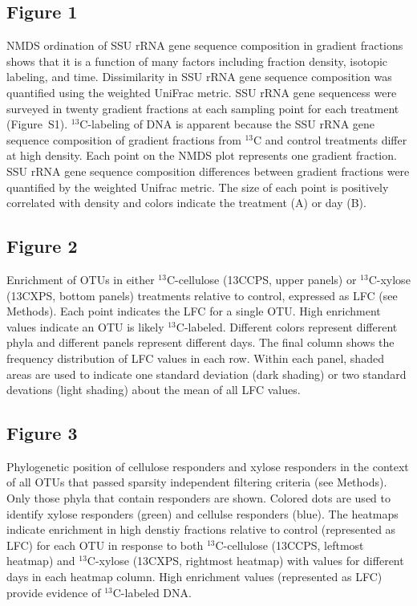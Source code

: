 \subsection{Figure 1}
NMDS ordination of SSU rRNA gene sequence composition in
gradient fractions shows that it is
a function of many factors including fraction density, isotopic labeling, and
time. Dissimilarity in SSU rRNA gene sequence composition was quantified using the 
weighted UniFrac metric. SSU rRNA gene sequencess were surveyed in twenty
gradient fractions at each sampling point for each treatment (Figure~S1).
$^{13}$C-labeling of DNA is apparent because the SSU rRNA gene sequence composition of
gradient fractions from $^{13}$C and control treatments differ at high density.
Each point on the NMDS plot represents one gradient fraction.  SSU rRNA gene sequence
composition differences between gradient fractions were quantified by the
weighted Unifrac metric. The size of each point is positively correlated with
density and colors indicate the treatment (A) or day (B).
\subsection{Figure 2}
Enrichment of OTUs in either $^{13}$C-cellulose (13CCPS, upper panels) or $^{13}$C-xylose (13CXPS, bottom panels) 
treatments relative to control, expressed as LFC (see Methods). Each point indicates the LFC for a single OTU. High
enrichment values indicate an OTU is likely $^{13}$C-labeled. Different colors
represent different phyla and different panels represent different days. The
final column shows the frequency distribution of LFC values in each row. Within
each panel, shaded areas are used to indicate one standard
deviation (dark shading) or two standard devations (light shading) about the
mean of all LFC values.
\subsection{Figure 3}
Phylogenetic position of cellulose responders and xylose responders in the context of all OTUs that passed 
sparsity independent filtering criteria (see Methods). Only those phyla that contain responders are shown.
Colored dots are used to identify xylose responders (green) and cellulse
responders (blue). The heatmaps indicate enrichment in high denstiy fractions
relative to control (represented as LFC) for each OTU in response to both
$^{13}$C-cellulose (13CCPS, leftmost heatmap) and $^{13}$C-xylose
(13CXPS, rightmost heatmap) with values for different days in each heatmap
column. High enrichment values (represented as LFC) provide evidence of $^{13}$C-labeled DNA.  


